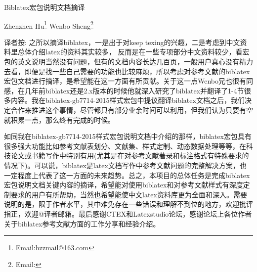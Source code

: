 \documentclass{ltxdockit}[2011/03/25]
\begin{document}
\printtitlepage

	\begin{trivlist}\setlength{\parskip}{2mm}\setlength{\itemindent}{2em}\item\relax
		{\hfill\heiti{}Biblatex宏包说明文档摘译 \hfill\hspace*{1pt}}\par
		{\hfill\fangsong{}Zhenzhen Hu\footnote{Email:hzzmail@163.com}\hspace*{1cm}%
                                  Wenbo Sheng\footnote{Email:}\hfill\hspace*{1pt}}\par
		{\hfill\kaiti{}\hfill\hspace*{1pt}}\par
		{\fangsong{}
译者按:
之所以摘译biblatex，一是出于对keep texing的兴趣，二是考虑到中文资料里总体介绍latex的资料其实较多，
反而是在一些专项部分中文资料较少，看宏包的英文说明当然没有问题，但有的文档内容长达几百页，一般用户真心没有精力去看，即便是找一些自己需要的功能也比较麻烦，所以考虑对参考文献的biblatex宏包文档进行摘译，是希望能在这一方面有所贡献。关于这一点Wenbo兄也很有同感，在几年前biblatex还是2.x版本的时候他就深入研究了biblatex并翻译了1-4节很多内容。我在biblatex-gb7714-2015样式宏包中提议翻译biblatex文档之后，我们决定合作来推进这个事情，尽管都只有部分业余时间可以利用，但我们认为只要有空就积累一点，那么终有完成的时候。

如同我在biblatex-gb7714-2015样式宏包说明文档中介绍的那样，biblatex宏包具有很多强大功能比如参考文献表划分、文献集、样式定制、动态数据处理等等，在科技论文或书籍写作中特别有用(尤其是在对参考文献著录和标注格式有特殊要求的情况下)。可以说，biblatex是latex文档写作中参考文献问题的完整解决方案，也一定程度上代表了这一方面的未来趋势。总之，本项目的总体任务是完成biblatex宏包说明文档关键内容的摘译，希望能对使用biblatex和对参考文献样式有深度定制要求的用户有所帮助，当然也希望能使中文latex资料库更为全面和深入。需要说明的是，限于作者水平，其中难免存在一些错误和理解不到位的地方，欢迎批评指正，欢迎@译者邮箱。最后感谢CTEX和Latexstudio论坛，感谢论坛上各位作者关于biblatex参考文献方面的工作分享和经验介绍。

}
	\end{trivlist}
\renewcommand{\contentsname}{目录}
\renewcommand{\listtablename}{表格}
\tableofcontents
\listoftables

\printglossary[type=trans,style=longragged3colborder,nopostdot=true,nogroupskip]%










\end{document}
